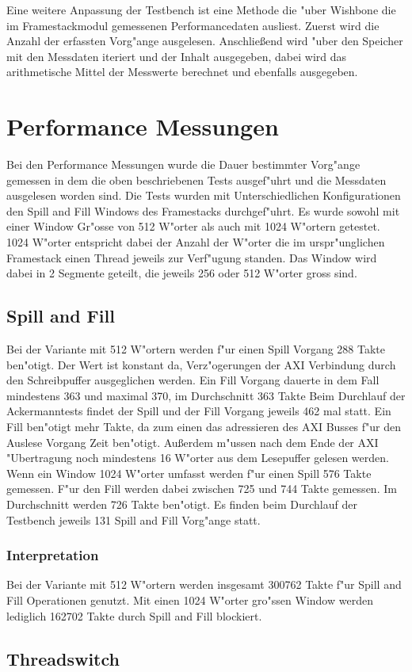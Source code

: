 Eine weitere Anpassung der Testbench ist eine Methode die "uber Wishbone die im Framestackmodul gemessenen Performancedaten ausliest.  Zuerst wird die Anzahl der erfassten Vorg"ange ausgelesen. Anschließend wird "uber den Speicher mit den Messdaten iteriert und der Inhalt ausgegeben, dabei wird das arithmetische Mittel der Messwerte berechnet und ebenfalls ausgegeben. 


\section{Performance Messungen}
Bei den Performance Messungen wurde die Dauer bestimmter Vorg"ange gemessen in dem die oben beschriebenen Tests ausgef"uhrt und die Messdaten ausgelesen worden sind. 
Die Tests wurden mit Unterschiedlichen Konfigurationen den Spill and Fill Windows des Framestacks durchgef"uhrt. Es wurde sowohl mit einer Window Gr"o{ss}e von 512 W"orter als auch mit 1024 W"ortern getestet. 1024 W"orter entspricht dabei der Anzahl der W"orter die im urspr"unglichen Framestack einen Thread jeweils zur Verf"ugung standen. Das Window wird dabei in 2 Segmente geteilt, die jeweils 256 oder 512 W"orter gro{ss} sind.

\subsection{Spill and Fill}

Bei der Variante mit 512 W"ortern werden f"ur einen Spill Vorgang 288 Takte ben"otigt. Der Wert ist konstant da, Verz"ogerungen der AXI Verbindung durch den Schreibpuffer ausgeglichen werden. Ein Fill Vorgang dauerte in dem Fall mindestens 363 und maximal 370, im Durchschnitt 363 Takte 
Beim Durchlauf der Ackermanntests findet der Spill und der Fill Vorgang jeweils 462 mal statt. 
Ein Fill ben"otigt mehr Takte, da zum einen das adressieren des AXI Busses f"ur den Auslese Vorgang Zeit ben"otigt. Außerdem m"ussen nach dem Ende der AXI "Ubertragung noch mindestens 16 W"orter aus dem Lesepuffer gelesen werden.  
Wenn ein Window 1024 W"orter umfasst werden f"ur einen Spill 576 Takte gemessen. F"ur den Fill werden dabei zwischen 725 und 744 Takte gemessen. Im Durchschnitt werden 726 Takte ben"otigt. 
Es finden beim Durchlauf der Testbench jeweils 131 Spill and Fill Vorg"ange statt. 
\subsubsection{Interpretation}
Bei der Variante mit 512 W"ortern werden insgesamt 300762 Takte f"ur Spill and Fill Operationen genutzt. Mit einen 1024 W"orter gro"{ss}en Window werden lediglich 162702 Takte durch Spill and Fill blockiert. 

\subsection{Threadswitch}

